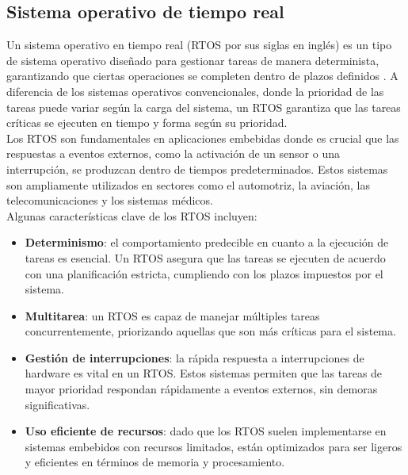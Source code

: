 \subsection{Sistema operativo de tiempo real}

Un sistema operativo en tiempo real (RTOS por sus siglas en inglés) es un tipo de sistema operativo diseñado para gestionar tareas de manera determinista, garantizando que ciertas operaciones se completen dentro de plazos definidos \cite{rtos}. A diferencia de los sistemas operativos convencionales, donde la prioridad de las tareas puede variar según la carga del sistema, un RTOS garantiza que las tareas críticas se ejecuten en tiempo y forma según su prioridad. \\

Los RTOS son fundamentales en aplicaciones embebidas donde es crucial que las respuestas a eventos externos, como la activación de un sensor o una interrupción, se produzcan dentro de tiempos predeterminados. Estos sistemas son ampliamente utilizados en sectores como el automotriz, la aviación, las telecomunicaciones y los sistemas médicos. \\

Algunas características clave de los RTOS incluyen:

\begin{itemize}
    \item \textbf{Determinismo}: el comportamiento predecible en cuanto a la ejecución de tareas es esencial. Un RTOS asegura que las tareas se ejecuten de acuerdo con una planificación estricta, cumpliendo con los plazos impuestos por el sistema.

    \item \textbf{Multitarea}: un RTOS es capaz de manejar múltiples tareas concurrentemente, priorizando aquellas que son más críticas para el sistema.

    \item \textbf{Gestión de interrupciones}: la rápida respuesta a interrupciones de hardware es vital en un RTOS. Estos sistemas permiten que las tareas de mayor prioridad respondan rápidamente a eventos externos, sin demoras significativas.

    \item \textbf{Uso eficiente de recursos}: dado que los RTOS suelen implementarse en sistemas embebidos con recursos limitados, están optimizados para ser ligeros y eficientes en términos de memoria y procesamiento.

\end{itemize}


